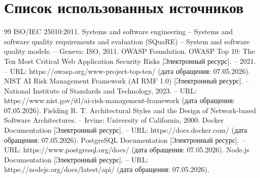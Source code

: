 \documentclass[14pt,a4paper]{extarticle}
\numberwithin{figure}{section}
\numberwithin{table}{section}
\begin{document}
\section*{Список использованных источников}
\begin{thebibliography}{99}
ISO/IEC 25010:2011. Systems and software engineering -- Systems and software quality requirements and evaluation (SQuaRE) -- System and software quality models. -- Geneva: ISO, 2011.
OWASP Foundation. OWASP Top 10: The Ten Most Critical Web Application Security Risks [Электронный ресурс]. -- 2021. -- URL: https://owasp.org/www-project-top-ten/ (дата обращения: 07.05.2026).
NIST AI Risk Management Framework (AI RMF 1.0) [Электронный ресурс]. -- National Institute of Standards and Technology, 2023. -- URL: https://www.nist.gov/itl/ai-risk-management-framework (дата обращения: 07.05.2026).
Fielding R. T. Architectural Styles and the Design of Network-based Software Architectures. -- Irvine: University of California, 2000.
Docker Documentation [Электронный ресурс]. -- URL: https://docs.docker.com/ (дата обращения: 07.05.2026).
PostgreSQL Documentation [Электронный ресурс]. -- URL: https://www.postgresql.org/docs/ (дата обращения: 07.05.2026).
Node.js Documentation [Электронный ресурс]. -- URL: https://nodejs.org/docs/latest/api/ (дата обращения: 07.05.2026).
\end{thebibliography}
\end{document}

